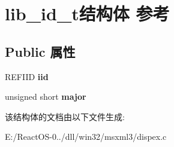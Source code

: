 \hypertarget{structlib__id__t}{}\section{lib\+\_\+id\+\_\+t结构体 参考}
\label{structlib__id__t}
\subsection*{Public 属性}
\begin{DoxyCompactItemize}
\item 
\mbox{\label{structlib__id__t_ab3120770a8652c2b89b309414c332639}} 
R\+E\+F\+I\+ID {\bfseries iid}
\item 
\mbox{\label{structlib__id__t_a1333d9b42b80efb655de9ee6a7b2d99c}} 
unsigned short {\bfseries major}
\end{DoxyCompactItemize}


该结构体的文档由以下文件生成\+:\begin{DoxyCompactItemize}
\item 
E\+:/\+React\+O\+S-\/0../dll/win32/msxml3/dispex.\+c\end{DoxyCompactItemize}
